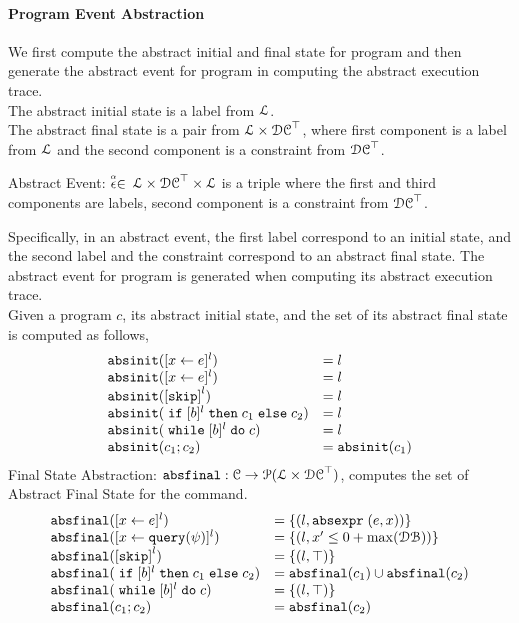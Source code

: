 \paragraph{Program Event Abstraction}
We first compute the abstract initial and final state for program and then generate the abstract event for program in 
computing the abstract execution trace.
\\
The abstract initial state is a label from $\mathcal{L}$.
\\
The abstract final state is a pair from $\mathcal{L} \times \mathcal{DC}^{\top}$,  
where first component is a label from $\mathcal{L}$ and the second component is a constraint from $\mathcal{DC}^{\top}$.
%
\begin{defn}
  \label{def:abs_event}
  Abstract Event: 
  $\stackrel{\scriptscriptstyle{\alpha}}{\mathtt{\epsilon}{}} \in $
  $\mathcal{L} \times \mathcal{DC}^{\top} \times \mathcal{L}$
  is a 
  triple where the first and third components are labels,
  second component is a constraint from $\mathcal{DC}^{\top}$.
  \end{defn}
  Specifically, in an abstract event, 
  the first label correspond to an initial state, and 
  the second label and the constraint correspond to an abstract final state.
  The abstract event for program is generated when computing its abstract execution trace.
\\
%
Given a program $c$, its abstract initial state,
and the set of its abstract final state is computed as follows,
%
\[
  \begin{array}{ll}
    \absinit(\clabel{\assign{x}{\expr}}{}^l)  & = l  \\
    \absinit(\clabel{\assign{x}{\expr}}{}^l)  & = l \\
    \absinit(\clabel{\eskip}^{l})  & = l \\
    \absinit(\eif [b]^l \ethen c_1 \eelse c_2)  & = l \\
    \absinit(\ewhile [b]^l \edo c)  & = l \\
    \absinit(c_1 ; c_2)  & = \absinit(c_1) \\
 \end{array}
 \]
%
Final State Abstraction: 
$\mathtt{abs}{\mathtt{final}}: \mathcal{C} \to \mathcal{P}(\mathcal{L} \times \mathcal{DC}^{\top})$,
computes the set of Abstract Final State for the command. 
 \[
  \begin{array}{ll}
    \absfinal(\clabel{\assign{x}{\expr}}{}^l)  & = \{(l, \absexpr\eapp (\expr, x))\}  \\
     \absfinal(\clabel{\assign{x}{\query(\qexpr)}}{}^l)  & = \{
      (l, x' \leq 0 + \max(\dbdom) )\}  \\
     \absfinal(\clabel{\eskip}^{l})  
     & = \{(l, \top)\} \\
     \absfinal(\eif [b]^l \ethen c_1 \eelse c_2)  & = \absfinal(c_1) \cup \absfinal(c_2) \\
     \absfinal(\ewhile [b]^l \edo c)  & = \{(l, \top)\} \\
     \absfinal(c_1 ; c_2)  & =  \absfinal(c_2) \\
 \end{array}
 \]
